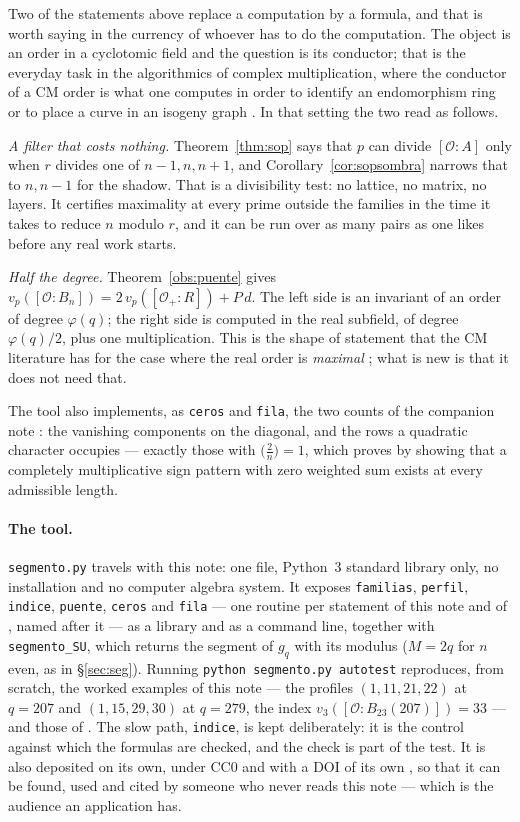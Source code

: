 \documentclass[11pt,a4paper]{article}
\theoremstyle{definition}
\newcommand{\cO}{\mathcal{O}}
\begin{document}
Two of the statements above replace a computation by a formula, and that is worth saying in the
currency of whoever has to do the computation. The object is an order in a cyclotomic field and the
question is its conductor; that is the everyday task in the algorithmics of complex multiplication,
where the conductor of a CM order is what one computes in order to identify an endomorphism ring or
to place a curve in an isogeny graph \cite{IT,BSt13}. In that setting the two read as follows.

\emph{A filter that costs nothing.} Theorem~\ref{thm:sop} says that $p$ can divide $[\cO:A]$ only
when $r$ divides one of $n-1,n,n+1$, and Corollary~\ref{cor:sopsombra} narrows that to $n,n-1$ for
the shadow. That is a divisibility test: no lattice, no matrix, no layers. It certifies maximality at
every prime outside the families in the time it takes to reduce $n$ modulo $r$, and it can be run over as many pairs as one likes before any real work starts.

\emph{Half the degree.} Theorem~\ref{obs:puente} gives
$v_p([\cO:B_n])=2\,v_p([\cO_+:R])+P\,d$. The left side is an invariant of an order of degree
$\varphi(q)$; the right side is computed in the real subfield, of degree $\varphi(q)/2$, plus one
multiplication. This is the shape of statement that the CM literature has for the case where the
real order is \emph{maximal} \cite[Lemmas 7, 8]{IT}; what is new is that it does not need that.

The tool also implements, as \texttt{ceros} and \texttt{fila}, the two counts of the companion
note \cite{II}: the vanishing components on the diagonal, and the rows a quadratic character
occupies --- exactly those with $\bigl(\frac2n\bigr)=1$, which \cite{II} proves by showing that a
completely multiplicative sign pattern with zero weighted sum exists at every admissible length.

\paragraph{The tool.} \texttt{segmento.py} travels with this note: one file, Python~3 standard
library only, no installation and no computer algebra system. It exposes
\texttt{familias}, \texttt{perfil}, \texttt{indice}, \texttt{puente}, \texttt{ceros} and
\texttt{fila} --- one routine per statement of this note and of \cite{II}, named after it --- as a
library and as a command line, together with \texttt{segmento\_SU}, which returns the segment of
$g_q$ with its modulus ($M=2q$ for $n$ even, as in \S\ref{sec:seg}). Running \texttt{python segmento.py autotest} reproduces, from
scratch, the worked examples of this note --- the profiles $(1,11,21,22)$ at $q=207$ and
$(1,15,29,30)$ at $q=279$, the index $v_3([\cO:B_{23}(207)])=33$ --- and those of \cite{II}. The slow
path, \texttt{indice}, is kept deliberately: it is the control against which the formulas are
checked, and the check is part of the test. It is also deposited on its own, under CC0 and with a
DOI of its own \cite{Tool}, so that it can be found, used and cited by someone who never reads this
note --- which is the audience an application has.
\end{document}
